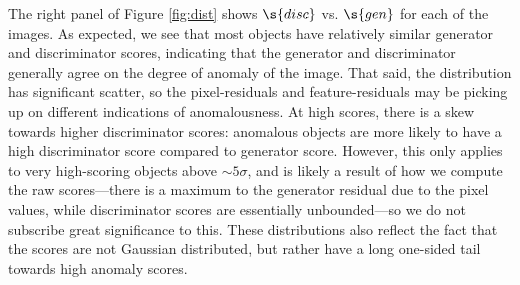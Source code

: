 The right panel of Figure \ref{fig:dist} shows $\s{disc}$ vs.  $\s{gen}$ for each of the images.
As expected, we see that most objects have relatively similar generator and discriminator scores, indicating that the generator and discriminator generally agree on the degree of anomaly of the image.
That said, the distribution has significant scatter, so the pixel-residuals and feature-residuals may be picking up on different indications of anomalousness.
At high scores, there is a skew towards higher discriminator scores: anomalous objects are more likely to have a high discriminator score compared to generator score.
However, this only applies to very high-scoring objects above $\sim5\sigma$, and is likely a result of how we compute the raw scores---there is a maximum to the generator residual due to the pixel values, while discriminator scores are essentially unbounded---so we do not subscribe great significance to this.
These distributions also reflect the fact that the scores are not Gaussian distributed, but rather have a long one-sided tail towards high anomaly scores.


